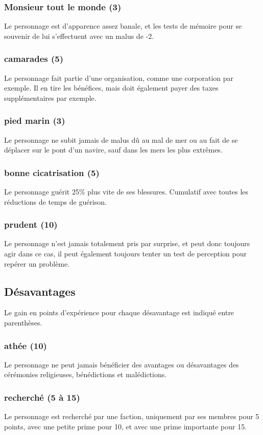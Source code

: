 \documentclass[10pt,a4paper,twocolumn]{book}
\begin{document}
\subsubsection{Monsieur tout le monde (3) }
Le personnage est d'apparence assez banale, et les tests de mémoire pour se souvenir de lui s'effectuent avec un malus de -2.
\subsubsection{camarades (5) }
Le personnage fait partie d'une organisation, comme une corporation par exemple. Il en tire les bénéfices, mais doit également payer des taxes supplémentaires par exemple.
\subsubsection{pied marin (3) }
Le personnage ne subit jamais de malus dû au mal de mer ou au fait de se déplacer sur le pont d'un navire, sauf dans les mers les plus extrêmes.
\subsubsection{bonne cicatrisation (5) }
Le personnage guérit 25\% plus vite de ses blessures. Cumulatif avec toutes les réductions de temps de guérison.
\subsubsection{prudent (10) }
Le personnage n'est jamais totalement pris par surprise, et peut donc toujours agir dans ce cas, il peut également toujours tenter un test de perception pour repérer un problème.
\subsection{Désavantages}
Le gain en points d’expérience pour chaque désavantage est indiqué entre parenthèses.
\subsubsection{athée (10) }
Le personnage ne peut jamais bénéficier des avantages ou désavantages des cérémonies religieuses, bénédictions et malédictions.
\subsubsection{recherché (5 à 15) }
Le personnage est recherché par une faction, uniquement par ses membres pour 5 points, avec une petite prime pour 10, et avec une prime importante pour 15.
\end{document}
